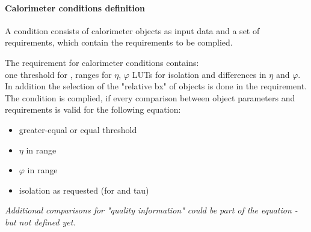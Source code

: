 \clearpage

\paragraph{Calorimeter conditions definition}\label{sec:gtl:calo_cond_def}

A condition consists of calorimeter objects as input data and a set of requirements, which contain the requirements to be complied.

The requirement for calorimeter conditions contains:\\
one threshold for \et, ranges for $\eta$, $\varphi$ LUTs for isolation and differences in $\eta$ and $\varphi$. In addition the selection of the "relative bx" of objects
is done in the requirement.\\
The condition is complied, if every comparison between object parameters and requirements is valid for the following equation:
\begin{itemize}
\item \et greater-equal or equal threshold
\item $\eta$ in range
\item $\varphi$ in range
\item isolation as requested (for \egamma and tau)
\end{itemize}
\textit{Additional comparisons for "quality information" could be part of the equation - but not defined yet.}

